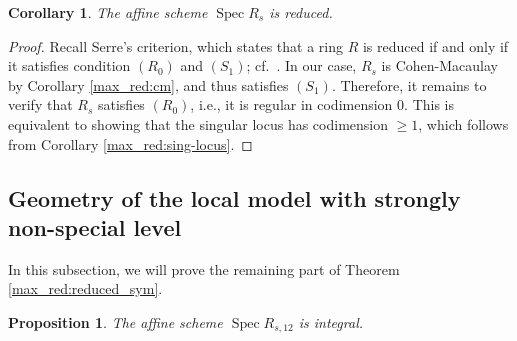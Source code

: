 \documentclass[pdflatex,sn-mathphys-num]{sn-jnl}%
\theoremstyle{thmstyleone}%
\newtheorem{proposition}[subsubsection]{Proposition}%
\newtheorem{corollary}[subsubsection]{Corollary}%
\theoremstyle{thmstyletwo}%
\numberwithin{equation}{subsection}
\theoremstyle{thmstylethree}%
\DeclareMathOperator{\Spec}{Spec}
\begin{document}
\begin{corollary}\label{max_red:lm}
    The affine scheme $\Spec R_s$ is reduced.
\end{corollary}
\begin{proof}
Recall Serre's criterion, which states that a ring $R$ is reduced if and only if it satisfies condition $(R_0)$ and $(S_1)$; cf.\ \cite[\href{https://stacks.math.columbia.edu/tag/031R}{031R}]{Stacks}.
In our case, $R_s$ is Cohen-Macaulay by Corollary \ref{max_red:cm}, and thus satisfies $(S_1)$.
Therefore, it remains to verify that $R_s$ satisfies $(R_0)$, i.e., it is regular in codimension $0$. This is equivalent to showing that the singular locus has codimension $\geq 1$, which follows from Corollary \ref{max_red:sing-locus}.
\end{proof}

\subsection{Geometry of the local model with strongly non-special level}
In this subsection, we will prove the remaining part of Theorem \ref{max_red:reduced_sym}.
\begin{proposition}\label{max_red:int}
The affine scheme $\Spec R_{s,12}$ is integral.
\end{proposition}
\end{document}
